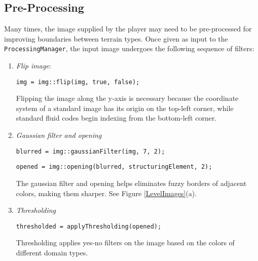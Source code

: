 \subsection{Pre-Processing}

Many times, the image supplied by the player may need to be pre-processed for improving boundaries between terrain types. Once given as input to the \verb|ProcessingManager|, the input image undergoes the following sequence of filters:

\begin{enumerate}
	\item \textit{Flip image}: 
	
	\verb|img = img::flip(img, true, false);|
	
	Flipping the image along the y-axis is necessary because the coordinate system of a standard image has its origin on the top-left corner, while standard fluid codes begin indexing from the bottom-left corner.

	\item \textit{Gaussian filter and opening}

	\verb|blurred = img::gaussianFilter(img, 7, 2);|

	\verb|opened = img::opening(blurred, structuringElement, 2);|
	
	The gaussian filter and opening helps eliminates fuzzy borders of adjacent colors, making them sharper. See Figure \ref{LevelImages}(a).

	\item \textit{Thresholding}

	\verb|thresholded = applyThresholding(opened);|
	
	Thresholding applies yes-no filters on the image based on the colors of different domain types.

\end{enumerate}
